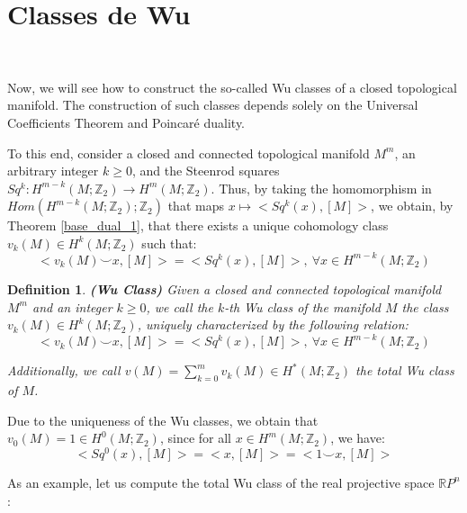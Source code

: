 \documentclass[12pt,oneside]{book}
\newtheorem{defi}   {Definition}[chapter]
\newcommand{\ds}{\displaystyle}
\newcommand{\RP}{\mathbb{R}P}
\newcommand{\Z}{\mathbb{Z}}
\newcommand{\ccup}{\smile}
\begin{document}
      
    \section{Classes de Wu}\label{ap_wu}

    \

    Now, we will see how to construct the so-called Wu classes of a closed topological manifold. The construction 
    of such classes depends solely on the Universal Coefficients Theorem and Poincaré 
    duality.

    To this end, consider a closed and connected topological manifold $M^{m}$, an arbitrary integer $k\geq 0$, and the Steenrod squares 
    $Sq^{k}:H^{m-k}(M;\Z_{2})\to H^{m}(M;\Z_{2})$. Thus, by taking the homomorphism in $Hom(H^{m-k}(M;\Z_{2});\Z_{2})$ that maps 
    $x \mapsto <Sq^{k}(x),[M]>$, we obtain, by Theorem \ref{base_dual_1}, that there exists a unique cohomology class 
    $v_{k}(M)\in H^{k}(M;\Z_{2})$ such that:
    $$ <v_{k}(M)\ccup x,[M]>=<Sq^{k}(x),[M]>, \ \forall x\in H^{m-k}(M;\Z_{2}) $$
    
    \begin{defi}{\bf (Wu Class)}
    Given a closed and connected topological manifold $M^{m}$ and an integer $k\geq 0$, we call the $k$-th Wu class of the 
    manifold $M$ the class $v_{k}(M)\in H^{k}(M;\Z_{2})$, uniquely characterized by the following relation:
    $$ <v_{k}(M)\ccup x,[M]>=<Sq^{k}(x),[M]>, \ \forall x\in H^{m-k}(M;\Z_{2}) $$
    
    Additionally, we call $v(M)=\ds\sum_{k=0}^{m} v_{k}(M)\in H^{*}(M;\Z_{2})$ the total Wu class of $M$.
    \end{defi}
    
    Due to the uniqueness of the Wu classes, we obtain that $v_{0}(M)=1\in H^{0}(M;\Z_{2})$, since for all $x\in H^{m}(M;\Z_{2})$, we have:
    $$ <Sq^{0}(x),[M]>=<x,[M]>=<1\ccup x,[M]> $$
    
    As an example, let us compute the total Wu class of the real projective space $\RP^{n}$:
    
\end{document}
